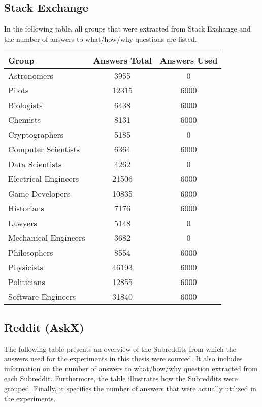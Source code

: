 \clearpage

\subsection{Stack Exchange}
\label{sec:appendix:datasets:stackex}
In the following table, all groups that were extracted from Stack Exchange and the number of answers to what/how/why questions are listed.

\begin{tabular}{lSS}
  \toprule
  {Group}              & {Answers Total} & {Answers Used} \\
  \midrule
  Astronomers          & 3955            & 0              \\
  Pilots               & 12315           & 6000           \\
  Biologists           & 6438            & 6000           \\
  Chemists             & 8131            & 6000           \\
  Cryptographers       & 5185            & 0              \\
  Computer Scientists  & 6364            & 6000           \\
  Data Scientists      & 4262            & 0              \\
  Electrical Engineers & 21506           & 6000           \\
  Game Developers      & 10835           & 6000           \\
  Historians           & 7176            & 6000           \\
  Lawyers              & 5148            & 0              \\
  Mechanical Engineers & 3682            & 0              \\
  Philosophers         & 8554            & 6000           \\
  Physicists           & 46193           & 6000           \\
  Politicians          & 12855           & 6000           \\
  Software Engineers   & 31840           & 6000           \\
  \bottomrule
\end{tabular}

\vfill
\clearpage

\subsection{Reddit (AskX)}
\label{sec:appendix:datasets:askx}
The following table presents an overview of the Subreddits from which the answers used for the experiments in this thesis were sourced. It also includes information on the number of answers to what/how/why question extracted from each Subreddit. Furthermore, the table illustrates how the Subreddits were grouped. Finally, it specifies the number of answers that were actually utilized in the experiments.

